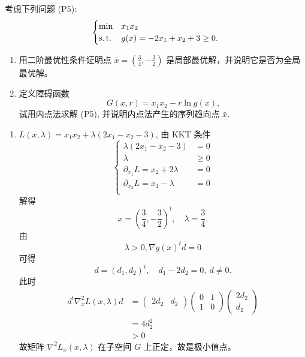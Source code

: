 \begin{Problem}
    考虑下列问题 (P5):
    \[
        \begin{cases}
            \min &x_1x_2\\
            \operatorname{s.t.} &g(x) = -2x_1 + x_2 + 3 \ge 0.
        \end{cases}
    \]
    \begin{enumerate}[label=(\arabic*)]
        \item 用二阶最优性条件证明点 $\bar{x} = \left(\frac{3}{4}, -\frac{3}{2}\right)$ 是局部最优解，并说明它是否为全局最优解。
        \item 定义障碍函数 
        \[
            G(x, r) = x_1x_2 - r\ln g(x)\text{,}
        \]
        试用内点法求解 (P5), 并说明内点法产生的序列趋向点 $\bar{x}$.
    \end{enumerate}

    \Answer
    \leavevmode
    \begin{enumerate}[label=(\arabic*)]
        \item $L(x, \lambda) = x_1x_2 + \lambda(2x_1 - x_2 - 3)$, 由 KKT 条件
        \[
            \begin{cases}
                \lambda(2x_1 - x_2 - 3) &= 0\\
                \lambda &\ge 0\\
                \partial_{x_1}L = x_2 + 2\lambda &= 0\\
                \partial_{x_2}L = x_1 - \lambda &= 0\\
            \end{cases}
        \]
        解得 
        \[
            x = \left(\frac{3}{4}, -\frac{3}{2}\right)^t, \quad \lambda = \dfrac{3}{4}.
        \]
        由 
        \[
            \lambda > 0, \nabla g(x)^td = 0
        \]
        可得 
        \[
            d = (d_1, d_2)^t, \quad  d_1 - 2d_2 = 0,\ d \neq 0.
        \] 
        此时 
        \begin{align*}
            d^t\nabla^2_xL(x, \lambda)d &= \begin{pmatrix}
                2d_2 & d_2
            \end{pmatrix} \begin{pmatrix}
                0 & 1 \\ 1 & 0
            \end{pmatrix} \begin{pmatrix}
                2d_2 \\ d_2
            \end{pmatrix}\\
            &=4d_2^2\\
            &> 0
        \end{align*} 
        故矩阵 $\nabla^2L_x(x, \lambda)$ 在子空间 $G$ 上正定，故是极小值点。


\end{enumerate}
\end{Problem}
